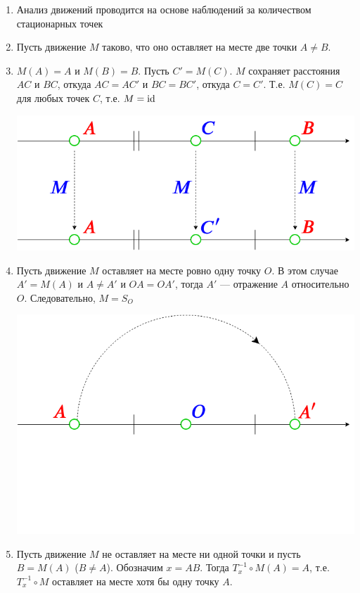 \begin{enumerate}
\item Анализ движений проводится на основе наблюдений за количеством стационарных точек
\item Пусть движение $M$ таково, что оно оставляет на месте две точки $A\ne B$.
\item $M(A)=A$ и $M(B)=B$. Пусть $C'=M(C)$. $M$ сохраняет расстояния $AC$ и $BC$, откуда $AC=AC'$ и $BC=BC'$, откуда $C=C'$. Т.е. $M(C)=C$ для любых точек $C$, т.е. $M=\mathrm{id}$

\begin{center}
\includegraphics[scale=0.35]{LineMoving.png}
\end{center}
\item Пусть движение $M$ оставляет на месте ровно одну точку $O$. В этом случае $A'=M(A)$ и $A\ne A'$ и $OA=OA'$, тогда $A'$ --- отражение $A$ относительно $O$. Следовательно, $M=S_O$
\begin{center}
\includegraphics[scale=0.35]{LineMovingO.png}
\end{center}
\item Пусть движение $M$ не оставляет на месте ни одной точки и пусть $B=M(A)$ ($B\ne A$). Обозначим $x=AB$. Тогда $T_{x}^{-1}\circ M(A)=A$, т.е. $T_{x}^{-1}\circ M$ оставляет на месте хотя бы одну точку $A$.

\end{enumerate}
